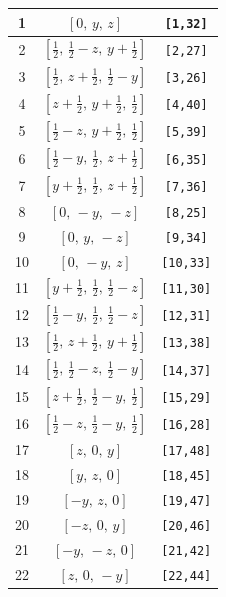 \documentclass[fleqn,8pt]{jsarticle}
\begin{document}
\begin{longtable}{ccc}
1 & $\left[ 0,\, y,\, z \right]$ & {\tt [1,32]} \\ \hline
2 & $\left[ \frac{1}{2},\, \frac{1}{2} - z,\, y + \frac{1}{2} \right]$ & {\tt [2,27]} \\ \hline
3 & $\left[ \frac{1}{2},\, z + \frac{1}{2},\, \frac{1}{2} - y \right]$ & {\tt [3,26]} \\ \hline
4 & $\left[ z + \frac{1}{2},\, y + \frac{1}{2},\, \frac{1}{2} \right]$ & {\tt [4,40]} \\ \hline
5 & $\left[ \frac{1}{2} - z,\, y + \frac{1}{2},\, \frac{1}{2} \right]$ & {\tt [5,39]} \\ \hline
6 & $\left[ \frac{1}{2} - y,\, \frac{1}{2},\, z + \frac{1}{2} \right]$ & {\tt [6,35]} \\ \hline
7 & $\left[ y + \frac{1}{2},\, \frac{1}{2},\, z + \frac{1}{2} \right]$ & {\tt [7,36]} \\ \hline
8 & $\left[ 0,\, - y,\, - z \right]$ & {\tt [8,25]} \\ \hline
9 & $\left[ 0,\, y,\, - z \right]$ & {\tt [9,34]} \\ \hline
10 & $\left[ 0,\, - y,\, z \right]$ & {\tt [10,33]} \\ \hline
11 & $\left[ y + \frac{1}{2},\, \frac{1}{2},\, \frac{1}{2} - z \right]$ & {\tt [11,30]} \\ \hline
12 & $\left[ \frac{1}{2} - y,\, \frac{1}{2},\, \frac{1}{2} - z \right]$ & {\tt [12,31]} \\ \hline
13 & $\left[ \frac{1}{2},\, z + \frac{1}{2},\, y + \frac{1}{2} \right]$ & {\tt [13,38]} \\ \hline
14 & $\left[ \frac{1}{2},\, \frac{1}{2} - z,\, \frac{1}{2} - y \right]$ & {\tt [14,37]} \\ \hline
15 & $\left[ z + \frac{1}{2},\, \frac{1}{2} - y,\, \frac{1}{2} \right]$ & {\tt [15,29]} \\ \hline
16 & $\left[ \frac{1}{2} - z,\, \frac{1}{2} - y,\, \frac{1}{2} \right]$ & {\tt [16,28]} \\ \hline
17 & $\left[ z,\, 0,\, y \right]$ & {\tt [17,48]} \\ \hline
18 & $\left[ y,\, z,\, 0 \right]$ & {\tt [18,45]} \\ \hline
19 & $\left[ - y,\, z,\, 0 \right]$ & {\tt [19,47]} \\ \hline
20 & $\left[ - z,\, 0,\, y \right]$ & {\tt [20,46]} \\ \hline
21 & $\left[ - y,\, - z,\, 0 \right]$ & {\tt [21,42]} \\ \hline
22 & $\left[ z,\, 0,\, - y \right]$ & {\tt [22,44]} \\ \hline

\end{longtable}
\end{document}
